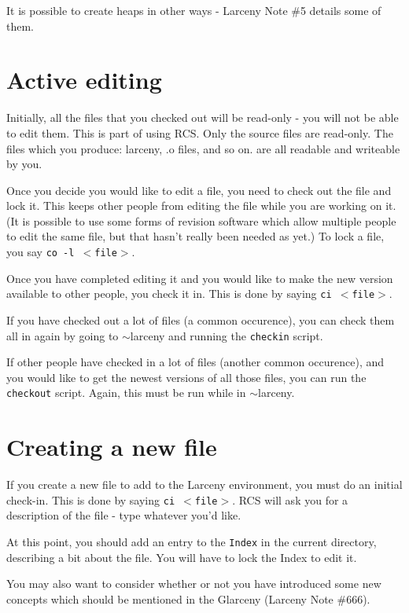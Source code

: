 It is possible to create heaps in other ways - Larceny Note \#5 details
some of them.

\section{Active editing}

Initially, all the files that you checked out will be read-only - you 
will not be able to edit them.  This is part of using RCS.  Only 
the source files are read-only.  The files which you produce: larceny,
.o files, and so on. are all readable and writeable by you.

Once you decide you would like to edit a file, you need to check out the
file and lock it.  This keeps other people from editing the file while
you are working on it.  (It is possible to use some forms of revision
software which allow multiple people to edit the same file, but that
hasn't really been needed as yet.)  To lock a file, you say 
{\tt co -l $<$file$>$}.  

Once you have completed editing it and you would like to make the new
version available to other people, you check it in.  This is done by
saying {\tt ci $<$file$>$}.

If you have checked out a lot of files (a common occurence), you can
check them all in again by going to $\sim$larceny and running the
{\tt checkin} script.

If other people have checked in a lot of files (another common
occurence), and you would like to get the newest versions of all those
files, you can run the {\tt checkout} script.  Again, this must be
run while in $\sim$larceny.

\section{Creating a new file}

If you create a new file to add to the Larceny environment, you must
do an initial check-in.  This is done by saying {\tt ci $<$file$>$}.
RCS will ask you for a description of the file - type whatever you'd
like.  

At this point, you should add an entry to the {\tt Index} in the current
directory, describing a bit about the file.  You will have to lock the
Index to edit it. 

You may also want to consider whether or not you have introduced some
new concepts which should be mentioned in the Glarceny (Larceny Note \#666).

